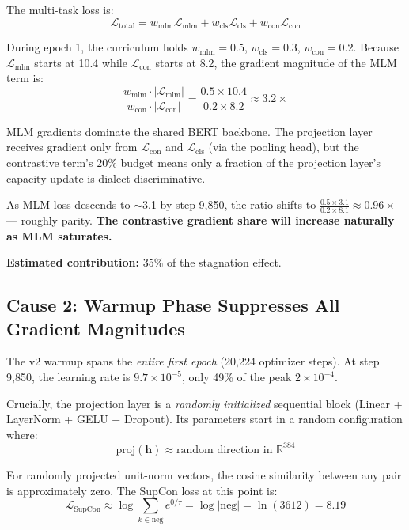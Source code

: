 \documentclass[11pt,a4paper]{article}
\newcommand{\loss}{\mathcal{L}}
\newcommand{\R}{\mathbb{R}}
\begin{document}
The multi-task loss is:
\begin{equation}
\loss_{\text{total}} = w_{\text{mlm}} \loss_{\text{mlm}} + w_{\text{cls}} \loss_{\text{cls}} + w_{\text{con}} \loss_{\text{con}}
\end{equation}

During epoch 1, the curriculum holds $w_{\text{mlm}} = 0.5$, $w_{\text{cls}} = 0.3$,
$w_{\text{con}} = 0.2$. Because $\loss_{\text{mlm}}$ starts at 10.4 while
$\loss_{\text{con}}$ starts at 8.2, the gradient magnitude of the MLM term is:
\begin{equation}
\frac{w_{\text{mlm}} \cdot |\loss_{\text{mlm}}|}{w_{\text{con}} \cdot |\loss_{\text{con}}|}
= \frac{0.5 \times 10.4}{0.2 \times 8.2} \approx 3.2\times
\end{equation}

MLM gradients dominate the shared BERT backbone. The projection layer receives gradient
only from $\loss_{\text{con}}$ and $\loss_{\text{cls}}$ (via the pooling head), but
the contrastive term's 20\% budget means only a fraction of the projection layer's
capacity update is dialect-discriminative.

As MLM loss descends to $\sim$3.1 by step 9{,}850, the ratio shifts to
$\frac{0.5 \times 3.1}{0.2 \times 8.1} \approx 0.96\times$ --- roughly parity.
\textbf{The contrastive gradient share will increase naturally as MLM saturates.}

\medskip
\noindent\textbf{Estimated contribution:} 35\% of the stagnation effect.

\subsection{Cause 2: Warmup Phase Suppresses All Gradient Magnitudes}
\label{sec:cause2}

The v2 warmup spans the \emph{entire first epoch} (20{,}224 optimizer steps). At
step 9{,}850, the learning rate is $9.7 \times 10^{-5}$, only 49\% of the peak
$2 \times 10^{-4}$.

Crucially, the projection layer is a \emph{randomly initialized} sequential block
(Linear + LayerNorm + GELU + Dropout). Its parameters start in a random configuration
where:
\begin{equation}
\text{proj}(\mathbf{h}) \approx \text{random direction in } \R^{384}
\end{equation}

For randomly projected unit-norm vectors, the cosine similarity between any pair is
approximately zero. The SupCon loss at this point is:
\begin{equation}
\loss_{\text{SupCon}} \approx \log \sum_{k \in \text{neg}} e^{0/\tau} = \log |\text{neg}| = \ln(3612) = 8.19
\end{equation}
\end{document}

